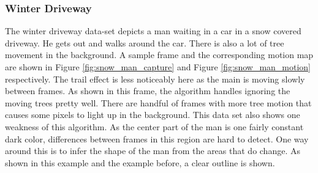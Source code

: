 \documentclass[journal]{IEEEtran}
\begin{document}
\subsubsection{Winter Driveway}
The winter driveway data-set depicts a man waiting in a car in a snow covered driveway. He gets out and walks
around the car. There is also a lot of tree movement in the background. A sample frame and the corresponding 
motion map are shown in Figure \ref{fig:snow_man_capture} and Figure \ref{fig:snow_man_motion} respectively. The
trail effect is less noticeably here as the main is moving slowly between frames. As shown in this frame, 
the algorithm handles ignoring the moving trees pretty well. There are handful of frames with more tree
motion that causes some pixels to light up in the background. This data set also shows one weakness of
this algorithm. As the center part of the man is one fairly constant dark color, differences between frames
in this region are hard to detect. One way around this is to infer the shape of the man from the areas that
do change. As shown in this example and the example before, a clear outline is shown.
\end{document}
